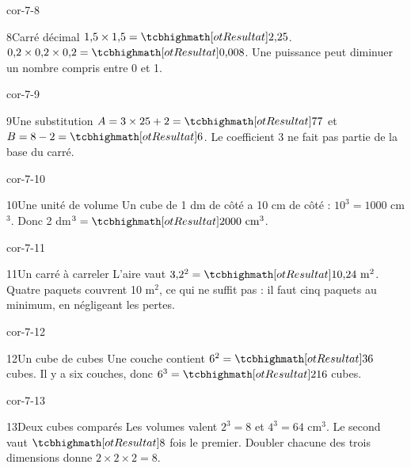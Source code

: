 \begin{blocLivre}{cor-7-8}\begin{corrige}{8}{Carré décimal}
$1{,}5\times1{,}5=\res{2{,}25}$. $0{,}2\times0{,}2\times0{,}2=\res{0{,}008}$. Une puissance peut diminuer un nombre compris entre 0 et 1.
\end{corrige}\end{blocLivre}
\begin{blocLivre}{cor-7-9}\begin{corrige}{9}{Une substitution}
$A=3\times25+2=\res{77}$ et $B=8-2=\res6$. Le coefficient 3 ne fait pas partie de la base du carré.
\end{corrige}\end{blocLivre}
\begin{blocLivre}{cor-7-10}\begin{corrige}{10}{Une unité de volume}
Un cube de 1 dm de côté a 10 cm de côté : $10^3=1000$ cm$^3$. Donc 2 dm$^3=\res{2000\ \mathrm{cm}^3}$.
\end{corrige}\end{blocLivre}
\begin{blocLivre}{cor-7-11}\begin{corrige}{11}{Un carré à carreler}
L’aire vaut $3{,}2^2=\res{10{,}24\ \mathrm{m}^2}$. Quatre paquets couvrent 10 m$^2$, ce qui ne suffit pas : il faut cinq paquets au minimum, en négligeant les pertes.
\label{fig-cor-7-11}
\end{corrige}\end{blocLivre}
\begin{blocLivre}{cor-7-12}\begin{corrige}{12}{Un cube de cubes}
Une couche contient $6^2=\res{36}$ cubes. Il y a six couches, donc $6^3=\res{216}$ cubes.
\label{fig-cor-7-12}
\end{corrige}\end{blocLivre}
\begin{blocLivre}{cor-7-13}\begin{corrige}{13}{Deux cubes comparés}
Les volumes valent $2^3=8$ et $4^3=64$ cm$^3$. Le second vaut $\res8$ fois le premier. Doubler chacune des trois dimensions donne $2\times2\times2=8$.
\label{fig-cor-7-13}
\end{corrige}\end{blocLivre}
